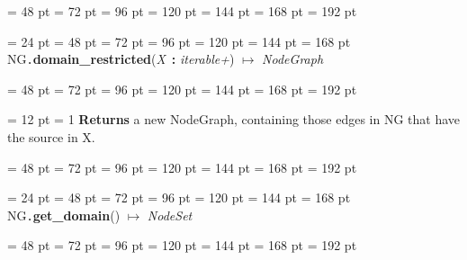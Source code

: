 {{{{{\par}
\par}
{\par \noindent  \leftskip = 48 pt  \leftmargini = 72 pt  \leftmarginii = 96 pt  \leftmarginiii = 120 pt  \leftmarginiv = 144 pt  \leftmarginv = 168 pt  \leftmarginvi = 192 pt {\par \noindent
\par}
\par}
\par}
\par}
{\par \noindent  \leftskip = 24 pt  \leftmargini = 48 pt  \leftmarginii = 72 pt  \leftmarginiii = 96 pt  \leftmarginiv = 120 pt  \leftmarginv = 144 pt  \leftmarginvi = 168 pt NG{\tt .\/}{\bf {\large {\bf domain{\_}restricted\/}}\/}({\em X\/}~{\bf :}  {\em iterable+\/}) \(\mapsto \)  {\em NodeGraph\/}{\par \noindent
{\par \noindent  \leftskip = 48 pt  \leftmargini = 72 pt  \leftmarginii = 96 pt  \leftmarginiii = 120 pt  \leftmarginiv = 144 pt  \leftmarginv = 168 pt  \leftmarginvi = 192 pt {\par \noindent
{\par \pagebreak[3.100000] \noindent \hangindent = 12 pt \hangafter = 1 
{\bf Returns \/} a new NodeGraph, containing those edges in NG that have the source in X.\par}
\par}
\par}
{\par \noindent  \leftskip = 48 pt  \leftmargini = 72 pt  \leftmarginii = 96 pt  \leftmarginiii = 120 pt  \leftmarginiv = 144 pt  \leftmarginv = 168 pt  \leftmarginvi = 192 pt {\par \noindent
\par}
\par}
\par}
\par}
{\par \noindent  \leftskip = 24 pt  \leftmargini = 48 pt  \leftmarginii = 72 pt  \leftmarginiii = 96 pt  \leftmarginiv = 120 pt  \leftmarginv = 144 pt  \leftmarginvi = 168 pt NG{\tt .\/}{\bf {\large {\bf get{\_}domain\/}}\/}() \(\mapsto \)  {\em NodeSet\/}{\par \noindent
{\par \noindent  \leftskip = 48 pt  \leftmargini = 72 pt  \leftmarginii = 96 pt  \leftmarginiii = 120 pt  \leftmarginiv = 144 pt  \leftmarginv = 168 pt  \leftmarginvi = 192 pt {\par \noindent
}}}}}

